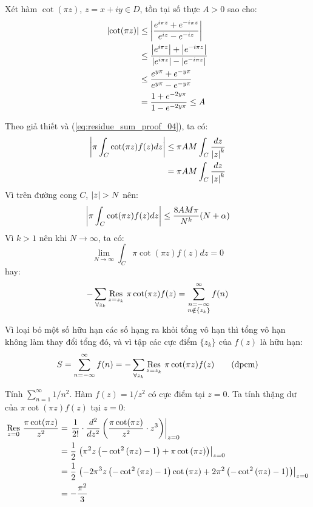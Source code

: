 Xét hàm $\cot(\pi z)$, $z = x + iy \in D$, tồn tại số thực $A>0$ sao cho:
\begin{align}
	\label{eq:residue_sum_proof_04}
	\abs{\cot(\pi z)}
	&\le \abs{\frac{e^{i\pi z} + e^{-i\pi z}}{e^{iz} - e^{-iz}}}\nonumber\\
	&\le \frac{\abs{e^{i\pi z}}+\abs{e^{-i\pi z}}}{\abs{e^{i\pi z}}-\abs{e^{-i\pi z}}}\nonumber\\
	&\le \frac{e^{y\pi} + e^{-y\pi}}{e^{y\pi}-e^{-y\pi}}\nonumber\\
	&= \frac{1+e^{-2y\pi}}{1-e^{-2y\pi}}\le A
\end{align}

Theo giả thiết và (\ref{eq:residue_sum_proof_04}), ta có:
\begin{align}
	\abs{\pi\int_C \cot(\pi z) f(z) dz}
	&\le \pi AM \int_C \frac{dz}{\abs{z}^k}\nonumber\\
	&= \pi AM \int_C \frac{dz}{\abs{z}^k}
\end{align}
Vì trên đường cong $C$, $\abs{z} > N$ nên:
\begin{equation}
	\abs{\pi\int_C \cot(\pi z) f(z) dz} \le \frac{8 AM\pi}{N^k}(N+\alpha)
\end{equation}
Vì $k > 1$ nên khi $N \to \infty$, ta có:
\begin{equation}
	\lim_{N\to \infty} \int_C \pi \cot(\pi z) f(z)dz  = 0
\end{equation}
hay:
\begin{equation}
	-\sum_{\forall z_k} \Res{\pi \cot(\pi z) f(z)}{z=z_k} = \sum_{\substack{n = -\infty\\n\notin \{z_k\}}}^{\infty} f(n)
\end{equation}

Vì loại bỏ một số hữu hạn các số hạng ra khỏi tổng vô hạn thì tổng vô hạn không làm thay đổi tổng đó, và vì tập các cực điểm $\{z_k\}$ của $f(z)$ là hữu hạn:
\begin{equation}
	S = \sum_{n=-\infty}^{\infty} f(n) = -\sum_{\forall z_k} \Res{\pi\cot(\pi z)f(z)}{z=z_k} \tag{đpcm}
\end{equation}

\begin{example}
	Tính $\sum_{n=1}^\infty 1/n^2$. Hàm $f(z) = 1/z^2$ có cực điểm tại $z=0$. Ta tính thặng dư của $\pi \cot(\pi z) f(z)$ tại $z=0$:
	\begin{align*}
		\Res{\frac{\pi \cot(\pi z)}{z^2}}{z=0} 
		&= \left.\frac{1}{2!}\cdot\frac{d^2}{dz^2}\left(\frac{\pi \cot(\pi z)}{z^2}\cdot z^3 \right) \right\rvert_{z=0}\\
		&= \frac 1 2 \left.\left(\pi^{2} z \left(- \cot^{2}{\left(\pi z \right)} - 1\right) + \pi \cot{\left(\pi z \right)}
		\right)\right\rvert_{z=0}\\ 
		&= \frac 1 2 \left.\left(- 2 \pi^{3} z \left(- \cot^{2}{\left(\pi z \right)} - 1\right) \cot{\left(\pi z \right)} + 2 \pi^{2} \left(- \cot^{2}{\left(\pi z \right)} - 1\right)\right)\right\rvert_{z=0}\\
		&= - \frac{ \pi^{2}}{3}
	\end{align*}
\end{example}

